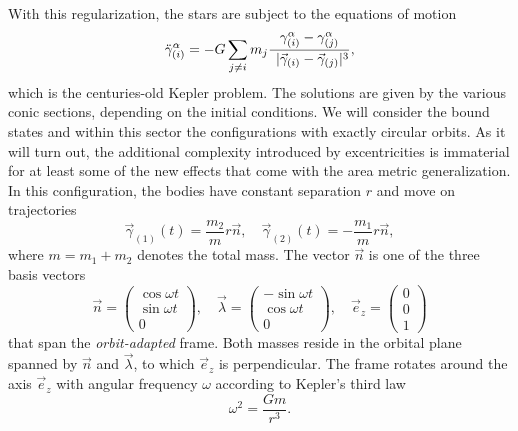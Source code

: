 With this regularization, the stars are subject to the equations of motion
\begin{equation}
  \ddot\gamma^\alpha_{(i)} = -G \sum_{j\neq i} m_j \frac{\gamma^\alpha_{(i)} - \gamma^\alpha_{(j)}}{\prescript{\hphantom{3}}{}\lvert\vec\gamma_{(i)} - \vec\gamma_{(j)}\rvert^3},
\end{equation}
which is the centuries-old Kepler problem. The solutions are given by the various conic sections, depending on the initial conditions. We will consider the bound states and within this sector the configurations with exactly circular orbits. As it will turn out, the additional complexity introduced by excentricities is immaterial for at least some of the new effects that come with the area metric generalization. In this configuration, the bodies have constant separation $r$ and move on trajectories
\begin{equation}\label{circular_orbit}
  \vec\gamma_{(1)}(t) = \frac{m_2}{m} r\vec n,\quad \vec\gamma_{(2)}(t) = -\frac{m_1}{m} r\vec n,
\end{equation}
where $m = m_1 + m_2$ denotes the total mass. The vector $\vec n$ is one of the three basis vectors
\begin{equation}
  \vec n = \begin{pmatrix} \operatorname{cos}\omega t \\ \operatorname{sin}\omega t \\ 0 \end{pmatrix},\quad \vec \lambda = \begin{pmatrix} -\operatorname{sin}\omega t \\ \operatorname{cos}\omega t \\ 0 \end{pmatrix},\quad \vec e_z = \begin{pmatrix}0 \\ 0 \\ 1\end{pmatrix}
\end{equation}
that span the \emph{orbit-adapted} frame\cite{poisson}. Both masses reside in the orbital plane spanned by $\vec n$ and $\vec\lambda$, to which $\vec e_z$ is perpendicular. The frame rotates around the axis $\vec e_z$ with angular frequency $\omega$ according to Kepler's third law
\begin{equation}
  \omega^2 = \frac{Gm}{r^3}.
\end{equation}

